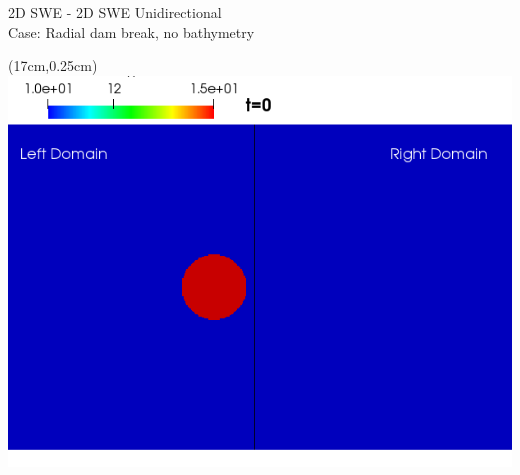 \begin{frame}
\vspace{-0.5cm}
{\large \hspace{3mm} 2D SWE - 2D SWE Unidirectional}\\
Case: Radial dam break, no bathymetry
\begin{textblock*}{5cm}(17cm,0.25cm) %
\includegraphics[scale=0.2]{./Resources/Images/unidirectional0_g_0.png}
\end{textblock*}


\end{frame}
